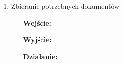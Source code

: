 \documentclass[a4paper, 11pt]{article}
\begin{document}
\begin{enumerate}[label*=\arabic*.]
\begin{enumerate}[label*=\arabic*.]
\begin{itemize}
				\item [\textbf{Wyjście:}]
				\item [\textbf{Działanie:}] 
			\end{itemize}
			\item Zbieranie potrzebnych dokumentów			
			\begin{itemize}
				\item [\textbf{Wejście:}] 
				\item [\textbf{Wyjście:}]
				\item [\textbf{Działanie:}] 
			\end{itemize}
		\end{enumerate}	
	\end{enumerate}
	
	
	
	
		
\end{document}
